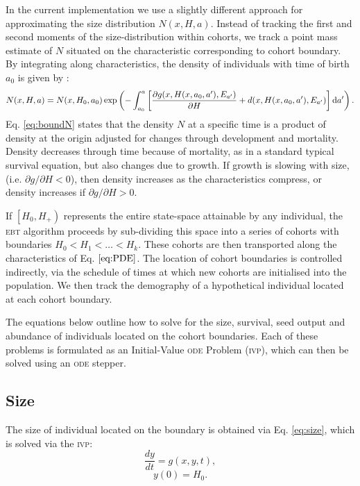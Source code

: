 \documentclass[10pt,twoside]{article}
\begin{document}
In the current implementation we use a slightly different approach for
approximating the size distribution \(N(x, H, a)\). Instead of tracking
the first and second moments of the size-distribution within cohorts, we
track a point mass estimate of \(N\) situated on the characteristic
corresponding to cohort boundary. By integrating along characteristics,
the density of individuals with time of birth \(a_{0}\) is given by
\citep{Deroos-1997}:
\begin{equation}\label{eq:boundN}
  N(x, H, a) = N(x, H_0 , a_0)
   \exp \left( - \int _{a_0}^{a} \left[\frac{\partial g(x, H(x, a_0, a^\prime), E_{a^\prime})}{\partial H} + d(x, H(x, a_0, a^\prime), E_{a^\prime})\right] {\rm d} a^\prime \right).
\end{equation}
Eq. \ref{eq:boundN} states that the density \(N\) at a specific time is
a product of density at the origin adjusted for changes through
development and mortality. Density decreases through time because of
mortality, as in a standard typical survival equation, but also changes
due to growth. If growth is slowing with size, (i.e.
\(\partial g / \partial H < 0\)), then density increases as the
characteristics compress, or density increases if
\(\partial g / \partial H > 0\).

If \(\left[H_0, H_{ + } \right)\) represents the entire state-space
attainable by any individual, the \textsc{ebt} algorithm proceeds by sub-dividing
this space into a series of cohorts with boundaries
\(H_0 < H_1 < \ldots < H_k\). These cohorts are then transported along
the characteristics of Eq. \(\ref{eq:PDE}\). The location of cohort
boundaries is controlled indirectly, via the schedule of times at which
new cohorts are initialised into the population. We then track the
demography of a hypothetical individual located at each cohort boundary.

The equations below outline how to solve for the size, survival, seed
output and abundance of individuals located on the cohort boundaries.
Each of these problems is formulated as an Initial-Value \textsc{ode} Problem
(\textsc{ivp}), which can then be solved using an \textsc{ode} stepper.

\subsection{Size}\label{size}

The size of individual located on the boundary is obtained via Eq.
\ref{eq:size}, which is solved via the \textsc{ivp}:
\[\frac{dy}{dt} = g(x, y, t) ,\] \[ y(0) = H_0.\]
\end{document}
